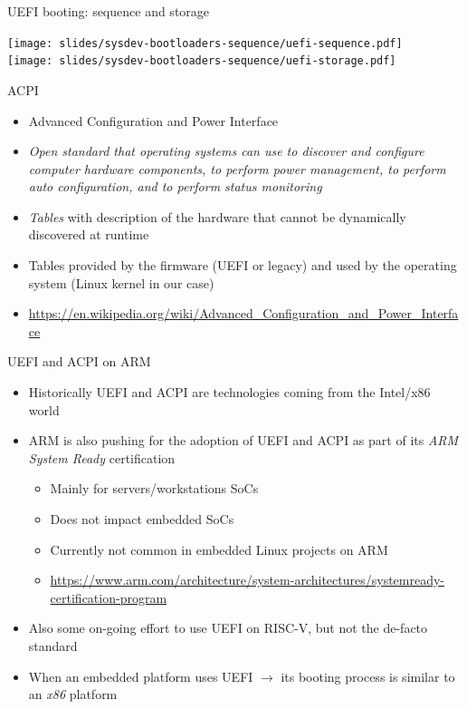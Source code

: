 \begin{frame}{UEFI booting: sequence and storage}
  \begin{center}
    \vspace{0.5cm}
    \texttt{[image: slides/sysdev-bootloaders-sequence/uefi-sequence.pdf]}\\
    \vspace{0.5cm}
    \texttt{[image: slides/sysdev-bootloaders-sequence/uefi-storage.pdf]}\\
  \end{center}
\end{frame}

\begin{frame}{ACPI}
  \begin{itemize}
  \item Advanced Configuration and Power Interface
  \item {\em Open standard that operating systems can use to discover
      and configure computer hardware components, to perform power
      management, to perform auto configuration, and to perform status
      monitoring}
  \item {\em Tables} with description of the hardware that cannot be
    dynamically discovered at runtime
  \item Tables provided by the firmware (UEFI or legacy) and used by
    the operating system (Linux kernel in our case)
  \item \small \url{https://en.wikipedia.org/wiki/Advanced_Configuration_and_Power_Interface}
  \end{itemize}
\end{frame}

\begin{frame}{UEFI and ACPI on ARM}
  \begin{itemize}
  \item Historically UEFI and ACPI are technologies coming from the
    Intel/x86 world
  \item ARM is also pushing for the adoption of UEFI and ACPI as part
    of its {\em ARM System Ready} certification
    \begin{itemize}
    \item Mainly for servers/workstations SoCs
    \item Does not impact embedded SoCs
    \item Currently not common in embedded Linux projects on ARM
    \item \url{https://www.arm.com/architecture/system-architectures/systemready-certification-program}
    \end{itemize}
  \item Also some on-going effort to use UEFI on RISC-V, but not the
    de-facto standard
  \item When an embedded platform uses UEFI $\rightarrow$ its booting
    process is similar to an {\em x86} platform
  \end{itemize}
\end{frame}

